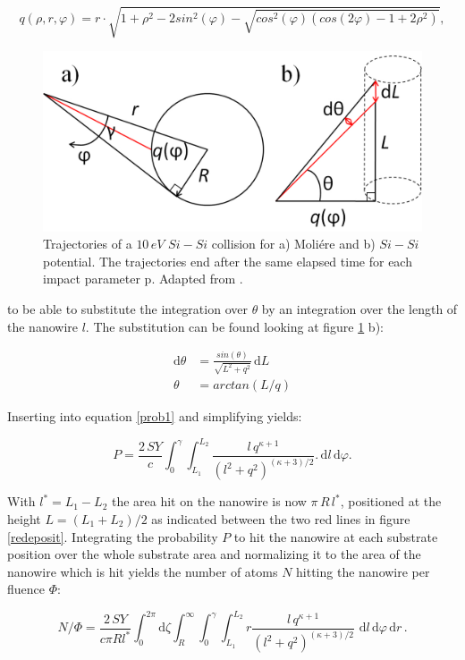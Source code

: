 \begin{equation}
q(\rho,r,\varphi) = r\cdot \sqrt{1 + \rho^2 - 2sin^2(\varphi) - \sqrt{cos^2(\varphi)(cos(2\varphi) - 1 + 2\rho^2)}},
\end{equation}

\begin{figure}
	\centering
		\includegraphics[width=.6\textwidth]{images/anglesredeposition.jpg}
	\caption{Trajectories of a $10\,eV$ $Si-Si$ collision for a) Moliére and b) $Si-Si$ potential. The trajectories end after the same elapsed time for each impact parameter p. Adapted from \cite{eckstein_computer_1991}.}
	\label{anglesredepo}
\end{figure} 

to be able to substitute the integration over $\theta$ by an integration over the length of the nanowire $l$. The substitution can be found looking at figure \ref{anglesredepo} b):

\begin{align*}
\mathrm{d}\theta &= \frac{sin(\theta)}{\sqrt{L^2 + q^2}}\,\mathrm{d}L\\
\theta &= arctan(L/q)
\end{align*}

Inserting into equation \ref{prob1} and simplifying yields:

\begin{equation}
\label{prob2}
P = \frac{2\,SY}{c} \int_0^{\gamma} \! \int_{L_1}^{L_2} \!  \frac{l\,q^{\kappa+1}}{(l^2 + q^2)^{(\kappa + 3)/2}}.
\,\mathrm{d}l \, \mathrm{d}\varphi.
\end{equation}

With $l^*=L_1-L_2$ the area hit on the nanowire is now $\pi \, R \, l^*$, positioned at the height $L= (L_1+L_2)/2$ as indicated between the two red lines in figure \ref{redeposit}. Integrating the probability $P$ to hit the nanowire at each substrate position over the whole substrate area and normalizing it to the area of the nanowire which is hit yields the number of atoms $N$ hitting the nanowire per fluence $\Phi$:

\begin{equation}
\label{prob2}
N/\Phi = \frac{2\,SY}{c \pi Rl^*} \int_0^{2\pi}\! \mathrm{d}\zeta \int_R^{\infty} \!
\int_0^{\gamma} \! \int_{L_1}^{L_2} \! r \frac{l\,q^{\kappa+1}}{(l^2 + q^2)^{(\kappa + 3)/2}}\,\,\mathrm{d}l \, \mathrm{d}\varphi\,\mathrm{d}r \, .
\end{equation}


